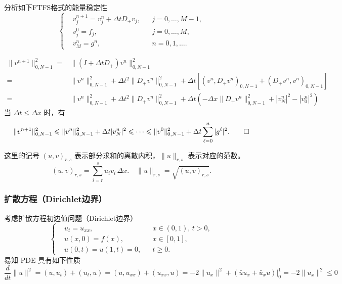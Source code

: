 \begin{example}
    分析如下FTFS格式的能量稳定性
    \[
        \left\{
        \begin{aligned}
             & v_j^{n+1} = v_j^n + \Delta t D_+ v_j, &  & j=0,\dots,M-1, \\
             & v_j^0 = f_j,                          &  & j=0,\dots,M,   \\
             & v_M^n = g^n,                          &  & n=0,1,\dots.
        \end{aligned}
        \right.
    \]
\end{example}

\begin{solution*}
    \begin{align*}
        \| v^{n+1}\|_{0,N-1}^2
        ={} & \|(I + \Delta t D_+) v^n\|_{0,N-1}^2                    \\
        ={} & \| v^n \|_{0,N-1}^2 + \Delta t^2 \| D_+ v^n\|_{0,N-1}^2
        + \Delta t \left[
            \left( v^n, D_+ v^n \right)_{0,N-1} + \left( D_+ v^n, v^n \right)_{0,N-1}
            \right]
        \\
        ={} & \| v^n \|_{0,N-1}^2 + \Delta t^2 \| D_+ v^n\|_{0,N-1}^2
        + \Delta t \left(
        - \Delta x \| D_+ v^n\|_{0,N-1}^2 + |v^n_N|^2 - |v^n_0|^2
        \right)
    \end{align*}
    当 $\Delta t \le \Delta x$ 时，有
    \[
        \| v^{n+1}\|_{0,N-1}^2 \le \| v^n \|_{0,N-1}^2  + \Delta t |v^n_N|^2
        \le \cdots \le \| v^0 \|_{0,N-1}^2  + \Delta t \sum_{\ell=0}^{n} |g^\ell|^2. \qedhere
    \]
\end{solution*}

\begin{remark}
    这里的记号 $(u,v)_{r,s}$ 表示部分求和的离散内积，$\|u\|_{r,s}$ 表示对应的范数。
    \[
        (u,v)_{r,s} = \sum_{i=r}^{s} \bar{u}_i v_i\, \Delta x.
        \quad \|u\|_{r,s} = \sqrt{(u,v)_{r,s}}.
    \]
\end{remark}

\subsubsection{扩散方程（Dirichlet边界）}

考虑扩散方程初边值问题（Dirichlet边界）
\[
    \left\{
    \begin{aligned}
         & u_t = u_{xx},        &  & x \in (0,1),\, t > 0, \\
         & u(x,0) = f(x),       &  & x \in [0,1],          \\
         & u(0,t) = u(1,t) = 0, &  & t \ge 0.
    \end{aligned}
    \right.
\]
易知 PDE 具有如下性质
\[
    \frac{d}{dt}\|u\|^2 = (u,u_t) + (u_t,u) = (u,u_{xx}) + (u_{xx},u)
    = -2 \|u_x\|^2 + (\bar{u} u_x + \bar{u}_x u) \big|_0^1 = -2 \|u_x\|^2 \le 0
\]

